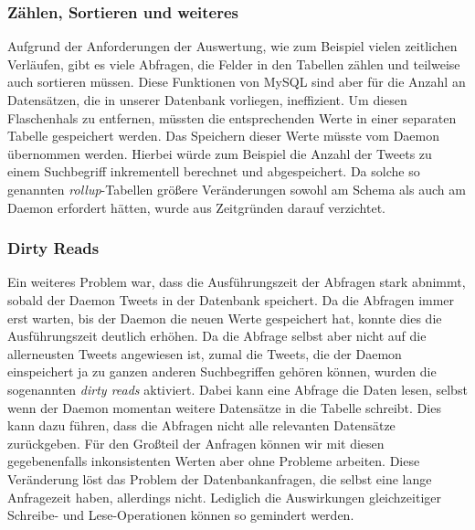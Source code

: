 \subsubsection{Zählen, Sortieren und weiteres}
Aufgrund der Anforderungen der Auswertung, wie zum Beispiel vielen zeitlichen Verläufen, gibt es viele Abfragen, die Felder in den Tabellen zählen und teilweise auch sortieren müssen. Diese Funktionen von MySQL sind aber für die Anzahl an Datensätzen, die in unserer Datenbank vorliegen, ineffizient.
Um diesen Flaschenhals zu entfernen, müssten die entsprechenden Werte in einer separaten Tabelle gespeichert werden. Das Speichern dieser Werte müsste vom Daemon übernommen werden. Hierbei würde zum Beispiel die Anzahl der Tweets zu einem Suchbegriff inkrementell berechnet und abgespeichert. Da solche so genannten \textit{rollup}-Tabellen größere Veränderungen sowohl am Schema als auch am Daemon erfordert hätten, wurde aus Zeitgründen darauf verzichtet.



\subsubsection{Dirty Reads}
Ein weiteres Problem war, dass die Ausführungszeit der Abfragen stark abnimmt, sobald der Daemon Tweets in der Datenbank speichert.
Da die Abfragen immer erst warten, bis der Daemon die neuen Werte gespeichert hat, konnte dies die Ausführungszeit deutlich erhöhen.
Da die Abfrage selbst aber nicht auf die allerneusten Tweets angewiesen ist, zumal die Tweets, die der Daemon einspeichert ja zu ganzen anderen Suchbegriffen gehören können, wurden die sogenannten \textit{dirty reads} aktiviert.
Dabei kann eine Abfrage die Daten lesen, selbst wenn der Daemon momentan weitere Datensätze in die Tabelle schreibt. Dies kann dazu führen, dass die Abfragen nicht alle relevanten Datensätze zurückgeben.
Für den Großteil der Anfragen können wir mit diesen gegebenenfalls inkonsistenten Werten aber ohne Probleme arbeiten.
Diese Veränderung löst das Problem der Datenbankanfragen, die selbst eine lange Anfragezeit haben, allerdings nicht. Lediglich die Auswirkungen gleichzeitiger Schreibe- und Lese-Operationen können so gemindert werden.

